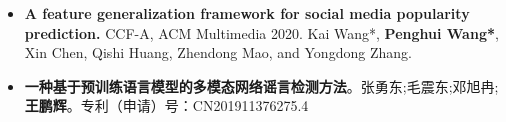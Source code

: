 \documentclass[zh]{resume}
\begin{document}
\begin{itemize}
  \item \textbf{A feature generalization framework for social media popularity prediction.} CCF-A, ACM Multimedia 2020. 
  Kai Wang*, \textbf{Penghui Wang*}, Xin Chen, Qishi Huang, Zhendong Mao, and Yongdong Zhang.
  \item \textbf{一种基于预训练语言模型的多模态网络谣言检测方法}。张勇东;毛震东;邓旭冉;\textbf{王鹏辉}。专利（申请）号：CN201911376275.4

\end{itemize}


\end{document}
